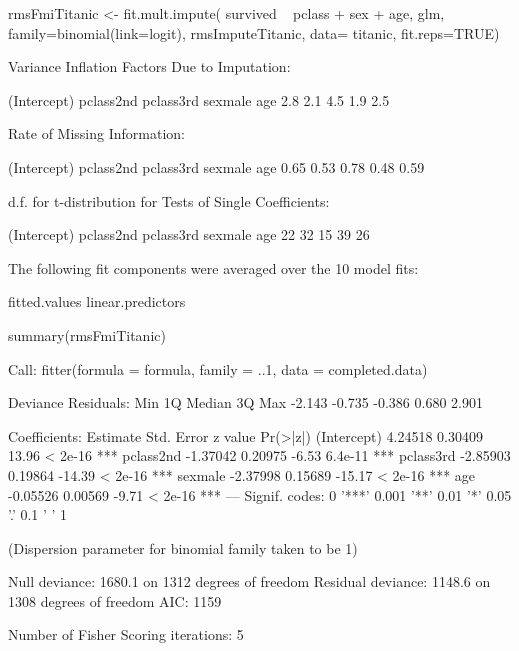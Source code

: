 \begin{Schunk}
\begin{Sinput}
 rmsFmiTitanic <- fit.mult.impute( survived ~ pclass + sex + age, glm, family=binomial(link=logit), rmsImputeTitanic, data= titanic, fit.reps=TRUE)
\end{Sinput}
\begin{Soutput}
Variance Inflation Factors Due to Imputation:

(Intercept)   pclass2nd   pclass3rd     sexmale         age 
        2.8         2.1         4.5         1.9         2.5 

Rate of Missing Information:

(Intercept)   pclass2nd   pclass3rd     sexmale         age 
       0.65        0.53        0.78        0.48        0.59 

d.f. for t-distribution for Tests of Single Coefficients:

(Intercept)   pclass2nd   pclass3rd     sexmale         age 
         22          32          15          39          26 

The following fit components were averaged over the 10 model fits:

  fitted.values linear.predictors 
\end{Soutput}
\begin{Sinput}
 summary(rmsFmiTitanic)
\end{Sinput}
\begin{Soutput}
Call:
fitter(formula = formula, family = ..1, data = completed.data)

Deviance Residuals: 
   Min      1Q  Median      3Q     Max  
-2.143  -0.735  -0.386   0.680   2.901  

Coefficients:
            Estimate Std. Error z value Pr(>|z|)    
(Intercept)  4.24518    0.30409   13.96  < 2e-16 ***
pclass2nd   -1.37042    0.20975   -6.53  6.4e-11 ***
pclass3rd   -2.85903    0.19864  -14.39  < 2e-16 ***
sexmale     -2.37998    0.15689  -15.17  < 2e-16 ***
age         -0.05526    0.00569   -9.71  < 2e-16 ***
---
Signif. codes:  0 '***' 0.001 '**' 0.01 '*' 0.05 '.' 0.1 ' ' 1

(Dispersion parameter for binomial family taken to be 1)

    Null deviance: 1680.1  on 1312  degrees of freedom
Residual deviance: 1148.6  on 1308  degrees of freedom
AIC: 1159

Number of Fisher Scoring iterations: 5
\end{Soutput}
\end{Schunk}
